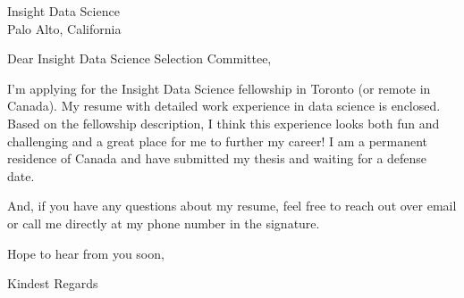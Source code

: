 \documentclass[10pt,letterpaper]{letter}
\begin{document}
 
\begin{letter}{Insight Data Science\\ Palo Alto, California} 
\opening{Dear Insight Data Science Selection Committee,} 
 
I'm applying for the Insight Data Science fellowship in Toronto (or remote in Canada).
My resume with detailed work experience in data science is enclosed. Based on the fellowship description, I think this experience looks both fun and challenging and a great place for me to further my career! I am a permanent residence of Canada and have submitted my thesis and waiting for a defense date.

And, if you have any questions about my resume, feel free to reach out over email or call me directly at my phone number in the signature.

Hope to hear from you soon,


\closing{Kindest Regards} 
\end{letter} 
\end{document}
